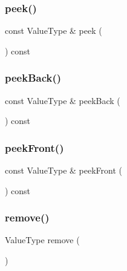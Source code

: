 \mbox{\label{classDeque_a74501ededf728c31068dd28a70a8a1f2}} 
\subsubsection{\texorpdfstring{peek()}{peek()}}
{\footnotesize\ttfamily const Value\+Type \& peek (\begin{DoxyParamCaption}{ }\end{DoxyParamCaption}) const}

\mbox{\label{classDeque_a617bbcedcfbc36e19f4aa806074da07e}} 
\subsubsection{\texorpdfstring{peek\+Back()}{peekBack()}}
{\footnotesize\ttfamily const Value\+Type \& peek\+Back (\begin{DoxyParamCaption}{ }\end{DoxyParamCaption}) const}

\mbox{\label{classDeque_a7bac5f26f5665291d89e8de29496ee79}} 
\subsubsection{\texorpdfstring{peek\+Front()}{peekFront()}}
{\footnotesize\ttfamily const Value\+Type \& peek\+Front (\begin{DoxyParamCaption}{ }\end{DoxyParamCaption}) const}

\mbox{\label{classDeque_a025ec97fa5b04552f5ad0902c1f02ac1}} 
\subsubsection{\texorpdfstring{remove()}{remove()}}
{\footnotesize\ttfamily Value\+Type remove (\begin{DoxyParamCaption}{ }\end{DoxyParamCaption})}

\mbox{\label{classDeque_af7878e9c2f67e06cbae525e9fa77e38e}} 
